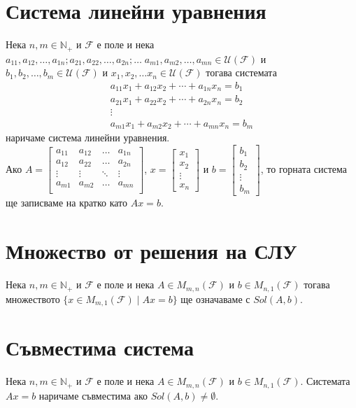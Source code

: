 \documentclass[a4paper,9pt]{extarticle}
\newcommand{\Nat}{\mathbb{N}}
\newcommand{\F}{\mathcal{F}}
\newcommand{\Uni}{\mathcal{U}}
\begin{document}
\section{Система линейни уравнения}
Нека \(n, m \in \Nat_+\) и \(\F\) е поле и нека \(a_{11}, a_{12}, \dots, a_{1n}; a_{21}, a_{22}, \dots, a_{2n}; \dots \; a_{m1}, a_{m2}, \dots, a_{mn} \in \Uni(\F)\) и \(b_1, b_2, \dots, b_m\in \Uni(\F)\) и \(x_1, x_2, \dots x_n \in \Uni(\F)\) тогава системата
\begin{align*}
    a_{11} x_1 + a_{12} x_2 + \cdots + a_{1n} x_n = b_1 \\
    a_{21} x_1 + a_{22} x_2 + \cdots + a_{2n} x_n = b_2 \\
    \vdots \\
    a_{m1} x_1 + a_{m2} x_2 + \cdots + a_{mn} x_n = b_m
\end{align*}
наричаме система линейни уравнения. \\
Ако \(A = \begin{bmatrix}
    a_{11} & a_{12} & \dots & a_{1n} \\
    a_{12} & a_{22} & \dots & a_{2n} \\
    \vdots & \vdots & \ddots &\vdots \\
    a_{m1} & a_{m2} & \dots & a_{mn} \\
\end{bmatrix}\), \(x = \begin{bmatrix}
    x_1 \\
    x_2 \\
    \vdots \\
    x_n
\end{bmatrix}\) и \(b = \begin{bmatrix}
    b_1 \\
    b_2 \\
    \vdots \\
    b_m
\end{bmatrix}\), то горната система ще записваме на кратко като \(Ax = b\).

\section{Множество от решения на СЛУ}
Нека \(n, m \in \Nat_+\) и \(\F\) е поле и нека \(A \in M_{m, n}(\F)\) и \(b \in M_{n, 1}(\F)\) тогава множеството
\(\{x \in M_{m, 1}(\F) \mid Ax = b\}\) ще означаваме с \(Sol(A, b)\).

\section{Съвместима система}
Нека \(n, m \in \Nat_+\) и \(\F\) е поле и нека \(A \in M_{m, n}(\F)\) и \(b \in M_{n, 1}(\F)\).
Системата \(Ax = b\) наричаме съвместима ако \(Sol(A, b) \neq \emptyset\).
\end{document}
